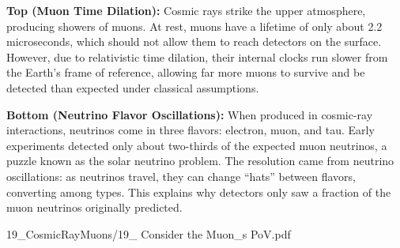 \begin{SideNotePage}{

    \textbf{Top (Muon Time Dilation):} Cosmic rays strike the upper atmosphere, producing showers of muons. At rest, muons have a lifetime of only about 2.2 microseconds, which should not allow them to reach detectors on the surface. However, due to relativistic time dilation, their internal clocks run slower from the Earth’s frame of reference, allowing far more muons to survive and be detected than expected under classical assumptions. \par
    \textbf{Bottom (Neutrino Flavor Oscillations):} When produced in cosmic-ray interactions, neutrinos come in three flavors: electron, muon, and tau. Early experiments detected only about two-thirds of the expected muon neutrinos, a puzzle known as the solar neutrino problem. The resolution came from neutrino oscillations: as neutrinos travel, they can change “hats” between flavors, converting among types. This explains why detectors only saw a fraction of the muon neutrinos originally predicted. \par

}{19_CosmicRayMuons/19_ Consider the Muon_s PoV.pdf}
\end{SideNotePage}
